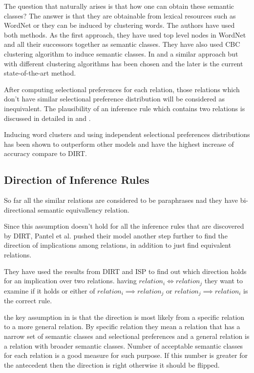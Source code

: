 \documentclass[12pt]{report}
\begin{document}
The question that naturally arises is that how one can obtain these semantic classes? The answer is that
they are obtainable from lexical resources such as WordNet or they can be induced by clustering words.
The authors have used both methods. As the first approach, they have used top level nodes in WordNet and all their successors together
as semantic classes. They have also used CBC clustering algorithm \cite{Pantel2002} to induce semantic classes. 
In \cite{Brown1992} and \cite{Lin2009} a similar approach but with different clustering algorithms has been chosen 
and the later is the current state-of-the-art method. 

After computing selectional preferences for each relation, those relations which don't have similar selectional preference
distribution will be considered as inequivalent. The plausibility of an inference rule which contains two relations is
discussed in detailed in \cite{Bhagat2007} and \cite{Kotlerman2010} .

Inducing word clusters and using independent selectional preferences distributions has been shown to outperform other models
and have the highest increase of accuracy compare to DIRT.     

\subsection{Direction of Inference Rules}
\label{ch:improve}
So far all the similar relations are considered to be paraphrases nad they have bi-directional semantic equivallency relation.

Since this assumption doesn't hold for all the inference rules that are discovered by DIRT, Pantel et al. pushed their model
another step further to find the direction of implications among relations, in addition to just find equivalent relations.

They have used the results from DIRT and ISP to find out which direction holds for an implication over two relations.
having $relation_i \iff relation_j$ they want to examine if it holds or either of $relation_i \implies relation_j$
or $relation_j \implies relation_i$ is the correct rule. 

the key assumption in \cite{Bhagat2007} is that the direction is most likely from a specific relation to a more general relation.
By specific relation they mean a relation that has a narrow set of semantic classes and selectional preferences and 
a general relation is a relation with broader semantic classes. Number of acceptable semantic classes for each relation is a 
good measure for such purpose. If this number is greater for the antecedent then the direction is right otherwise it should be flipped.
\end{document}
